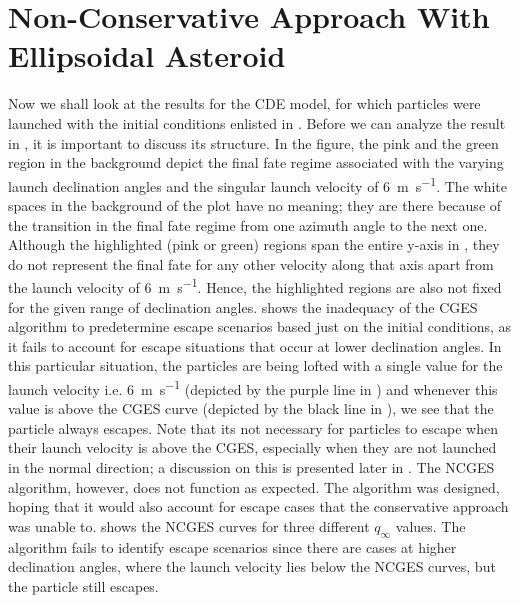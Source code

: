 \section{Non-Conservative Approach With Ellipsoidal Asteroid}
\label{sec:nonconservative_escape_cde_results}
Now we shall look at the results for the \gls{CDE} model, for which particles were launched with the initial conditions enlisted in . Before we can analyze the result in , it is important to discuss its structure. In the figure, the pink and the green region in the background depict the final fate regime associated with the varying launch declination angles and the singular launch velocity of \SI{6}{\metre\per\second}. The white spaces in the background of the plot have no meaning; they are there because of the transition in the final fate regime from one azimuth angle to the next one. Although the highlighted (pink or green) regions span the entire y-axis in , they do not represent the final fate for any other velocity along that axis apart from the launch velocity of \SI{6}{\metre\per\second}. Hence, the highlighted regions are also not fixed for the given range of declination angles.
%
\newline\newline
%
 shows the inadequacy of the \gls{CGES} algorithm to predetermine escape scenarios based just on the initial conditions, as it fails to account for escape situations that occur at lower declination angles. In this particular situation, the particles are being lofted with a single value for the launch velocity i.e. \SI{6}{\metre\per\second} (depicted by the purple line in ) and whenever this value is above the \gls{CGES} curve (depicted by the black line in ), we see that the particle always escapes. Note that its not necessary for particles to escape when their launch velocity is above the \gls{CGES}, especially when they are not launched in the normal direction; a discussion on this is presented later in . The \gls{NCGES} algorithm, however, does not function as expected. The algorithm was designed, hoping that it would also account for escape cases that the conservative approach was unable to.  shows the \gls{NCGES} curves for three different $q_\infty$ values. The algorithm fails to identify escape scenarios since there are cases at higher declination angles, where the launch velocity lies below the \gls{NCGES} curves, but the particle still escapes.
